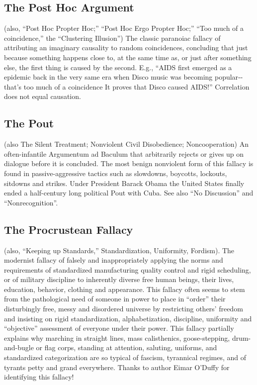 \documentclass[10pt,a4paper,british]{article}
\begin{document}
\begin{multicols}{2}
    \subsection{The Post Hoc Argument} (also, ``Post Hoc Propter Hoc;''  ``Post Hoc Ergo Propter Hoc;'' ``Too much of a coincidence,'' the ``Clustering Illusion'') The classic paranoiac fallacy of attributing an imaginary causality to random coincidences, concluding that just because something happens close to, at the same time as, or just after something else, the first thing is caused by the second. E.g., ``AIDS first emerged as a epidemic back in the very same era when Disco music was becoming popular{-}{-}that's too much of a coincidence It proves that Disco caused AIDS!''  Correlation does not equal causation.  

    \subsection{The Pout} (also The Silent Treatment; Nonviolent Civil Disobedience; Noncooperation) An often{-}infantile Argumentum ad Baculum that arbitrarily rejects or gives up on dialogue before it is concluded.  The most benign nonviolent form of this fallacy is found in passive{-}aggressive tactics such as slowdowns, boycotts, lockouts, sitdowns and strikes.  Under President Barack Obama the United States finally ended a half{-}century long political Pout with Cuba. See also ``No Discussion'' and ``Nonrecognition''.  

    \subsection{The Procrustean Fallacy} (also, ``Keeping up Standards,'' Standardization, Uniformity, Fordism).  The modernist fallacy of falsely and inappropriately applying the norms and requirements of standardized manufacturing  quality control and rigid scheduling, or of military discipline to inherently diverse free human beings, their lives, education, behavior, clothing and appearance. This fallacy often seems to stem from the pathological need of someone in power to place in ``order'' their disturbingly free, messy and disordered universe by restricting others' freedom and insisting on rigid standardization, alphabetization, discipline, uniformity and ``objective'' assessment of everyone under their power. This fallacy partially explains why marching in straight lines, mass calisthenics, goose{-}stepping, drum{-}and{-}bugle or flag corps, standing at attention, saluting, uniforms, and standardized categorization are so typical of fascism, tyrannical regimes, and of tyrants petty and grand everywhere. Thanks to author Eimar O'Duffy for identifying this fallacy!  


\end{multicols}
\end{document}
